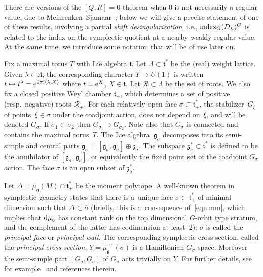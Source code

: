 \documentclass[pdftex]{sigma}
\numberwithin{equation}{section}
\newcommand{\pair}[2]{\langle #1, #2 \rangle}
\newcommand{\ol}[1]{\overline{#1}}
\renewcommand{\i}{{\mathrm{i}}}
\def\g{\ensuremath{\mathfrak{g}}}
\def\z{\ensuremath{\mathfrak{z}}}
\def\t{\ensuremath{\mathfrak{t}}}
\def\R{\ensuremath{\mathcal{R}}}
\def\index{\ensuremath{\textnormal{index}}}
\begin{document}
There are versions of the $[Q,R]=0$ theorem when $0$ is not necessarily a regular value, due to Meinrenken--Sjamaar~\cite{MeinrenkenSjamaar}; below we will give a precise statement of one of these results, involving a partial \emph{shift desingularization}, i.e., $\index_G(D_L)^G$ is related to the index on the symplectic quotient at a nearby weakly regular value. At the same time, we introduce some notation that will be of use later on.

Fix a maximal torus $T$ with Lie algebra $\t$. Let $\Lambda \subset \t^\ast$ be the (real) weight lattice. Given $\lambda \in \Lambda$, the corresponding character $T \rightarrow U(1)$ is written $t \mapsto t^\lambda={\rm e}^{2\pi \i\pair{\lambda}{X}}$ where $t={\rm e}^X$, $X \in \t$. Let $\R \subset \Lambda$ be the set of roots. We also fix a closed positive Weyl chamber $\t_+$, which determines a set of positive (resp.\ negative) roots $\R_{\pm}$. For each relatively open face $\sigma \subset \t_+^\ast$, the stabilizer~$G_\xi$ of points~$\xi \in \sigma$ under the coadjoint action, does not depend on~$\xi$, and will be denoted $G_\sigma$. If $\sigma_1 \subset \ol{\sigma}_2$ then $G_{\sigma_1}\supset G_{\sigma_2}$. Note also that $G_\sigma$ is connected and contains the maximal torus~$T$. The Lie algebra~$\g_\sigma$ decomposes into its semi-simple and central parts
$ \g_\sigma=[\g_\sigma,\g_\sigma]\oplus \z_\sigma$.
The subspace $\z_\sigma^\ast \subset \t^\ast$ is defined to be the annihilator of $[\g_\sigma,\g_\sigma]$, or equivalently the fixed point set of the coadjoint $G_\sigma$ action. The face $\sigma$ is an open subset of $\z_\sigma^\ast$.

Let $\Delta=\mu_\g(M)\cap \t_+^\ast$ be the moment polytope. A well-known theorem in symplectic geometry states that there is a~unique face $\sigma \subset \t^\ast_+$ of minimal dimension such that $\Delta \subset \ol{\sigma}$ (briefly, this is a~consequence of~\eqref{eqn:mm}, which implies that ${\rm d}\mu_\g$ has constant rank on the top dimensional $G$-orbit type stratum, and the complement of the latter has codimension at least~$2$); $\sigma$ is called the \emph{principal face} or \emph{principal wall}. The corresponding symplectic cross-section, called the \emph{principal cross-section},
$Y=\mu_\g^{-1}(\sigma)$
is a Hamiltonian $G_\sigma$-space. Moreover the semi-simple part $[G_\sigma,G_\sigma]$ of $G_\sigma$ acts trivially on $Y$. For further details, see for example~\cite{ConvexitySympCuts} and references therein.
\end{document}
